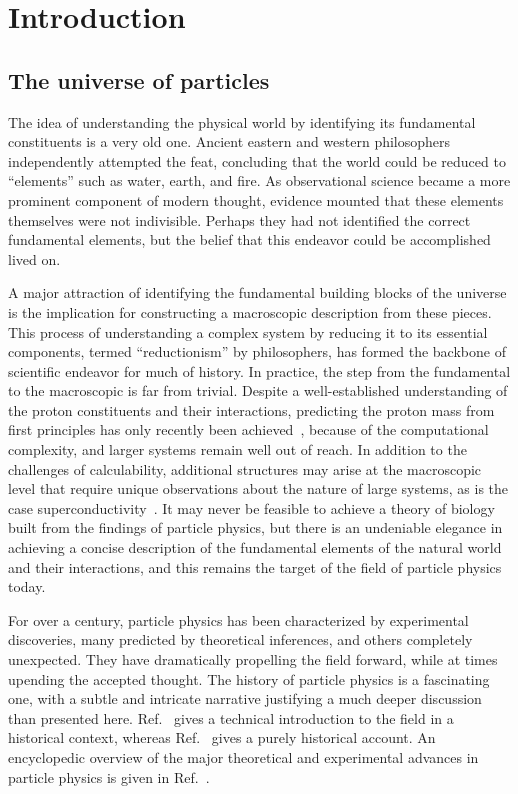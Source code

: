 \chapter{Introduction}
\label{ch:introduction}

\section{The universe of particles}

The idea of understanding the physical world by identifying its
fundamental constituents is a very old one. Ancient eastern and
western philosophers independently attempted the feat, concluding
that the world could be reduced 
to ``elements'' such as water, earth, and fire.
As observational science became a more prominent component of modern thought, 
evidence mounted that these elements themselves were 
not indivisible. Perhaps they had not identified
the correct fundamental elements, but the belief that this endeavor could
be accomplished lived on.

A major attraction of identifying the fundamental building blocks of the universe
is the implication for constructing a macroscopic description from these
pieces. This process of understanding a complex system 
by reducing it to its essential components,
termed ``reductionism'' by philosophers, 
has formed the backbone of scientific endeavor for much of history.
In practice, the step from the fundamental to the macroscopic 
is far from trivial. Despite a well-established
understanding of the proton constituents and their interactions,
predicting the proton mass from first principles has only recently 
been achieved~\cite{Durr:2008zz}, because of the computational complexity,
and larger systems remain well out of reach.
In addition to the challenges of calculability, additional structures
may arise at the macroscopic level that require unique observations
about the nature of large systems, as is the case
superconductivity~\cite{Anderson393}.
It may never be feasible
to achieve a theory of biology built from the findings of particle 
physics, but there is an undeniable elegance in achieving a concise description
of the fundamental elements of the natural world and their interactions,
and this remains the target of the field of particle physics today. 

For over a century, particle physics has been characterized by experimental
discoveries, many predicted by theoretical inferences, and others 
completely unexpected.
They have dramatically propelling the field forward,
while at times upending the accepted thought.
The history of particle physics is a fascinating one, with a subtle 
and intricate narrative justifying a much deeper discussion than presented
here. Ref.~\cite{Griffiths:2008zz} gives a technical introduction to the field in a historical
context, whereas Ref.~\cite{kragh2002quantum} gives a purely 
historical account. An encyclopedic overview of the major
theoretical and experimental advances in particle physics is given in Ref.~\cite{Ezhela:1996xi}.

